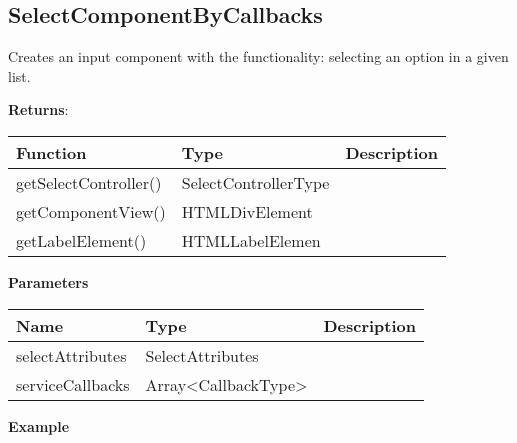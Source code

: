 \vspace*{6pt}
\subsection*{SelectComponentByCallbacks}

\vspace*{6pt}
Creates an input component with the functionality: selecting an option in a given list. 

\vspace*{18pt}
\noindent
\textbf{Returns}: 

\begin{table}[!htb] 
    \label{api:selectComponentByCallbacksReturn}
    \footnotesize
    \setlength\extrarowheight{4pt}
    \begin{tabular}{ p{3.5cm} p{3.5cm} p{6cm} }
        \toprule[1.2pt]
        \textbf{Function}     & \textbf{Type}        & \textbf{Description} \\
        \midrule
        getSelectController() & SelectControllerType &  \\
        getComponentView()    & HTMLDivElement       &  \\
        getLabelElement()     & HTMLLabelElemen      &  \\
        \bottomrule[1.2pt]
    \end{tabular}
\end{table}

\vspace*{6pt}
\noindent
\textbf{Parameters}

\begin{table}[!htb] 
    \label{api:selectComponentByCallbacksParameter}
    \footnotesize
    \setlength\extrarowheight{4pt}
    \begin{tabular}{ p{3.5cm} p{3.5cm} p{6cm} }
        \toprule[1.2pt]
        \textbf{Name}    & \textbf{Type}       & \textbf{Description} \\
        \midrule
        selectAttributes & SelectAttributes    &  \\
        serviceCallbacks & Array<CallbackType> &  \\
        \bottomrule[1.2pt]
    \end{tabular}
\end{table}

\vspace*{6pt}
\noindent
\textbf{Example}

